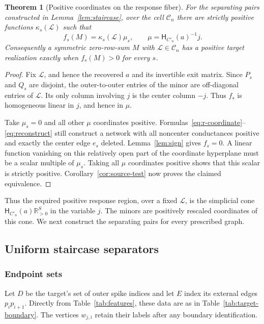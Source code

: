 \documentclass[11pt]{article}
\newtheorem{theorem}{Theorem}[section]
\theoremstyle{definition}
\newcommand{\RR}{\mathbb R}
\newcommand{\exitmat}{\mathsf H}
\newcommand{\cell}{\mathcal C}
\begin{document}
\begin{theorem}[Positive coordinates on the response fiber]
\label{thm:criterion}
For the separating pairs constructed in Lemma~\ref{lem:staircase},
over the cell $\cell_n$ there are strictly positive
functions $\kappa_s(\mathcal L)$ such that
\begin{equation}
 f_s(M)=\kappa_s(\mathcal L)\mu_s,
 \qquad \mu=\exitmat_{C'_n}(a)^{-1}j.
 \label{eq:minor-source}
\end{equation}
Consequently a symmetric zero-row-sum $M$ with
$\mathcal L\in\cell_n$ has a positive target realization exactly
when $f_s(M)>0$ for every $s$.
\end{theorem}
\begin{proof}
Fix $\mathcal L$, and hence the recovered $a$ and its invertible
exit matrix. Since $P_s$ and $Q_s$ are disjoint, the outer-to-outer
entries of the minor are off-diagonal entries of $\mathcal L$.
Its only column involving $j$ is the center column $-j$.
Thus $f_s$ is homogeneous linear in $j$, and hence in $\mu$.

Take $\mu_s=0$ and all other $\mu$ coordinates positive.
Formulas~\eqref{eq:r-coordinate}--\eqref{eq:reconstruct} still
construct a network with all noncenter conductances positive and
exactly the center edge $e_s$ deleted. Lemma~\ref{lem:sign} gives
$f_s=0$. A linear function vanishing on this relatively open part
of the coordinate hyperplane must be a scalar multiple of $\mu_s$.
Taking all $\mu$ coordinates positive shows that this scalar is
strictly positive. Corollary~\ref{cor:source-test} now proves the
claimed equivalence.
\end{proof}

Thus the required positive response region, over a fixed
$\mathcal L$, is the simplicial cone
$\exitmat_{C'_n}(a)\RR_{>0}^{S}$ in the variable $j$.
The minors are positively rescaled coordinates of this cone.
We next construct the separating pairs for every prescribed graph.

\subsection{Uniform staircase separators}
\label{sec:staircase}

\subsubsection{Endpoint sets}

Let $D$ be the target's set of outer spike indices and let $E$
index its external edges $p_ip_{i+1}$. Directly from
Table~\ref{tab:features}, these data are as in
Table~\ref{tab:target-boundary}. The vertices $w_{j,i}$ retain
their labels after any boundary identification.
\end{document}

